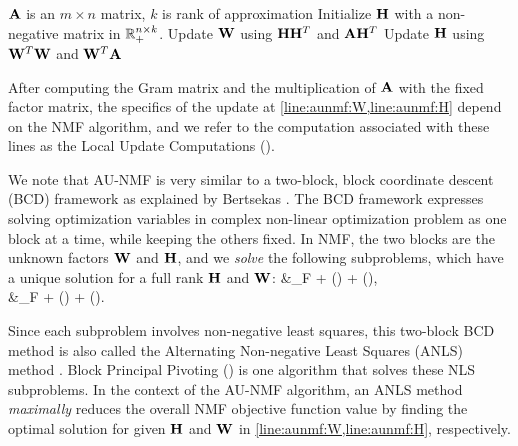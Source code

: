 \begin{algorithm}
\caption{$[\WW,\HH] = \text{AU-NMF}(A,k)$}
\label{alg:aunmf}
\begin{algorithmic}[1]
\REQUIRE $\AA$ is an $m\times n$ matrix, $k$ is rank of approximation
\STATE Initialize $\HH$ with a non-negative matrix in $\Rn{n\times k}_+$.
 \label{algo:nmfloop}
  \STATE Update $\WW$ using $\HH \HH^T$ and $\AA \HH^T$ \label{line:aunmf-w}
  \label{line:aunmf:W}
  \STATE Update $\HH$ using $\WW^T\WW$ and $\WW^T \AA$ \label{line:aunmf-h}
  \label{line:aunmf:H}
\ENDWHILE
\end{algorithmic}
\end{algorithm}

After computing the Gram matrix and the multiplication of $\AA$ with the fixed factor matrix, the specifics of the update at \cref{line:aunmf:W,line:aunmf:H} depend on the NMF algorithm, and we refer to the computation associated with these lines as the Local Update Computations (\LUC).

We note that AU-NMF is very similar to a two-block, block coordinate descent (BCD) framework as explained by Bertsekas \cite{bertsekas1999nonlinear}.
The BCD framework expresses solving optimization variables in complex non-linear optimization problem as one block at a time, while keeping the others fixed. In NMF,  the two blocks are
the unknown factors $\WW$ and $\HH$, 
and we \emph{solve} the following subproblems,
which have a unique solution for a full rank $\HH$ and $\WW$: 
\SplitN{\label{eqn:two block}} {
\WW &\leftarrow {}\NormBr{\AA-\tilde\WW\HH}_F +  \phi (\tilde \WW) + \psi (\HH),\\
\HH &\leftarrow  {}\NormBr{\AA-\WW\tilde\HH}_F + \phi (\WW) + \psi (\tilde \HH).
}

Since each subproblem involves non-negative least squares,
this two-block BCD method is also called
the Alternating Non-negative Least Squares (ANLS) method \cite{kim2013nonnegative}.
Block Principal Pivoting (\BPP) is one algorithm that solves these NLS subproblems.
In the context of the AU-NMF algorithm,
 an ANLS method {\em maximally} reduces 
the overall NMF objective function value 
by finding the optimal solution for
 given $\HH$ and $\WW$ in \cref{line:aunmf:W,line:aunmf:H}, respectively.  

